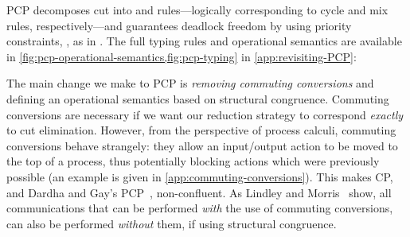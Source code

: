 \documentclass[main.tex]{subfiles}
\begin{document}
PCP decomposes cut into  and  rules---logically corresponding to cycle and mix rules, respectively---and guarantees deadlock freedom by using priority constraints, \eg, as in . The full typing rules and operational semantics are available in \cref{fig:pcp-operational-semantics,fig:pcp-typing} in \cref{app:revisiting-PCP}:
\begin{mathpar}
  \small
\end{mathpar}

The main change we make to PCP is \emph{removing commuting conversions} and defining an operational semantics based on structural congruence. Commuting conversions are necessary if we want our reduction strategy to correspond \emph{exactly} to cut elimination.
However, from the perspective of process calculi, commuting conversions behave strangely: they allow an input/output action to be moved to the top of a process, thus potentially blocking actions which were previously possible (an example is given in \cref{app:commuting-conversions}). This makes CP, and Dardha and Gay's PCP~\cite{dardhagay18}, non-confluent.
As Lindley and Morris~\cite{lindleymorris15} show, all communications that can be performed \emph{with} the use of commuting conversions, can also be performed \emph{without} them, if using structural congruence.
%
\end{document}
